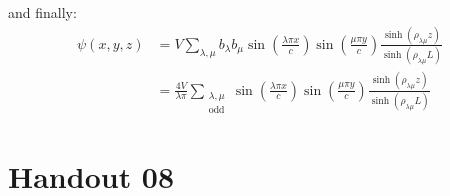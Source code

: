 \documentclass{article}
\begin{document}
\noindent
and finally:
\begin{align}
    \psi(x, y, z)
&= V \sum_{\lambda, \mu} b_\lambda b_\mu \sin\left( \frac{\lambda \pi x}{c} \right)
\sin\left( \frac{\mu \pi y}{c} \right)
\frac{ \sinh\left( \rho_{\lambda \mu} z \right) }{ \sinh\left( \rho_{\lambda \mu} L \right) }\\
&= \frac{4V}{\lambda \pi} \sum_{\substack{\lambda, \mu \\ \text{odd}}}\sin\left( \frac{\lambda \pi x}{c} \right)
\sin\left( \frac{\mu \pi y}{c} \right)
\frac{ \sinh\left( \rho_{\lambda \mu} z \right) }
{ \sinh\left( \rho_{\lambda \mu} L \right) }
\end{align}

\section{Handout 08}
\end{document}
